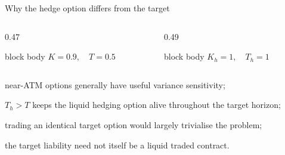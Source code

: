 \begin{frame}[t]{Why the hedge option differs from the target}
  \begin{columns}[T,onlytextwidth]
    \begin{column}{0.47\textwidth}
      \begin{beamercolorbox}[rounded=true,sep=0.18cm]{block body}
        \centering\Large\bfseries \(K=0.9,\quad T=0.5\)
      \end{beamercolorbox}
    \end{column}
    \begin{column}{0.49\textwidth}
      \begin{beamercolorbox}[rounded=true,sep=0.18cm]{block body}
        \centering\Large\bfseries \(K_h=1,\quad T_h=1\)
      \end{beamercolorbox}
    \end{column}
  \end{columns}
  \vspace{0.18cm}
  \begin{tightitemize}
    \item near-ATM options generally have useful variance sensitivity;
    \item \(T_h>T\) keeps the liquid hedging option alive throughout the target horizon;
    \item trading an identical target option would largely trivialise the problem;
    \item the target liability need not itself be a liquid traded contract.
  \end{tightitemize}
\end{frame}

